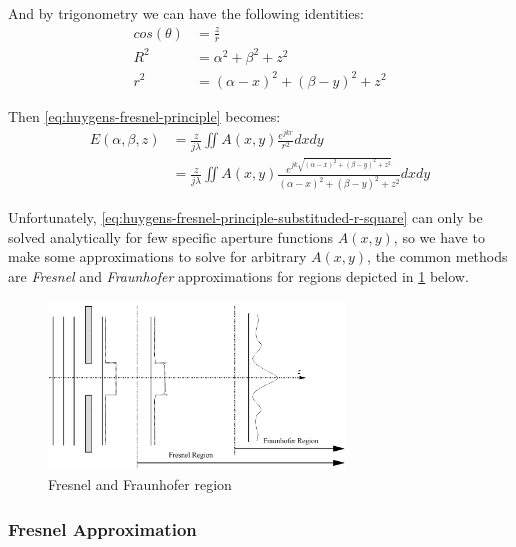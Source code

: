 And by trigonometry we can have the following identities:
\begin{align}
  cos(\theta) & = \frac{z}{r}                                               \\
  R^2         & = \alpha ^2 + \beta ^2 + z^2       \label{eq:trignometry-R} \\
  r^2         & = (\alpha-x)^2 + (\beta-y)^2 + z^2 \label{eq:trignometry-r}
\end{align}

Then \cref{eq:huygens-fresnel-principle} becomes:
\begin{align}
  E(\alpha, \beta, z) & = \frac{z}{j\lambda} \iint A(x,y)\frac{e^{jkr}}{r^2} dxdy                    \label{eq:huygens-fresnel-principle-substituded-cos}                                                      \\
                      & = \frac{z}{j\lambda} \iint A(x,y)\frac{e^{jk\sqrt{(\alpha-x)^2 + (\beta-y)^2 + z^2}}}{(\alpha-x)^2 + (\beta-y)^2 + z^2} dxdy \label{eq:huygens-fresnel-principle-substituded-r-square}
\end{align}

Unfortunately, \cref{eq:huygens-fresnel-principle-substituded-r-square} can only be solved analytically for few specific aperture functions $A(x,y)$, so we have to make some approximations to solve for arbitrary $A(x,y)$, the common methods are \textit{Fresnel} and \textit{Fraunhofer} approximations for regions depicted in \cref{fig:fresnel_fraunhofer_approximations} below.

\begin{figure}[H]
  \centering
  \includegraphics[width=0.7\textwidth]{fresnel_fraunhofer_approximations.png}
  \caption{Fresnel and Fraunhofer region \cite{Wilkinson2019}}\label{fig:fresnel_fraunhofer_approximations}
\end{figure}


\subsubsection{Fresnel Approximation}

